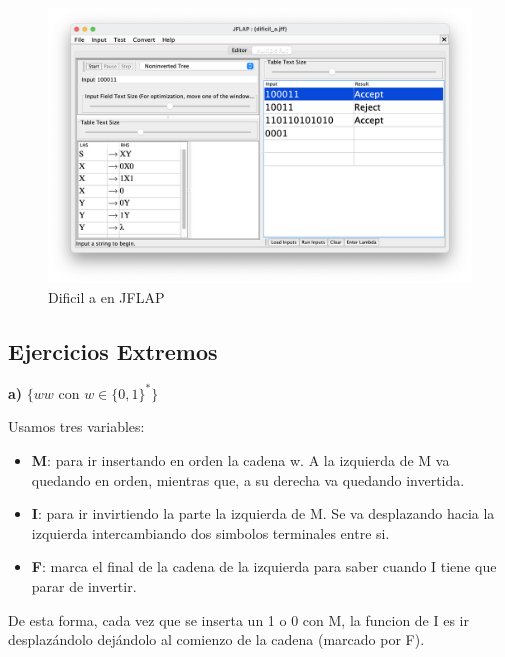 \begin{figure}[H] 
	\centering
	\includegraphics[scale=0.35]{../practica_1/images/dificil_a.png} 
	\caption{Dificil a en JFLAP} 
    \label{fig:dificil_a}
\end{figure}

\subsection{Ejercicios Extremos}

\textbf{a)}  $\{ ww$ con $w \in \{0,1\}^{\ast}\}$

Usamos tres variables:
\begin{itemize}
\item \textbf{M}: para ir insertando en orden la cadena w. A la izquierda de M va quedando en orden, mientras que, a su derecha va quedando invertida.
\item \textbf{I}: para ir invirtiendo la parte la izquierda de M. Se va desplazando hacia la izquierda intercambiando dos simbolos terminales entre si.
\item \textbf{F}: marca el final de la cadena de la izquierda para saber cuando I tiene que parar de invertir. 
\end{itemize}
De esta forma, cada vez que se inserta un 1 o 0 con M, la funcion de I es ir desplazándolo dejándolo al comienzo de la cadena (marcado por F).

